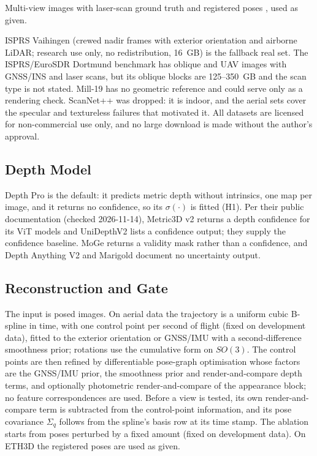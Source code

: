  Multi-view images with laser-scan ground truth and registered poses
\cite{data_eth3d}, used as given. 

 ISPRS Vaihingen (crewed nadir frames with exterior orientation and
airborne LiDAR; research use only, no redistribution, 16~GB) is the fallback real set. The ISPRS/EuroSDR
Dortmund benchmark has oblique and UAV images with GNSS/INS and laser scans, but its oblique blocks are
125--350~GB and the scan type is not stated. Mill-19 has no geometric reference and could serve only as a
rendering check. ScanNet++ was dropped: it is indoor, and the aerial sets cover the specular and
textureless failures that motivated it. All datasets are licensed for non-commercial use only, and no
large download is made without the author's approval.

\subsection{Depth Model}
Depth Pro \cite{est_depthpro} is the default: it predicts metric depth without intrinsics, one map per
image, and it returns no confidence, so its $\sigma(\cdot)$ is fitted (H1). Per their public
documentation (checked 2026-11-14), Metric3D v2 returns a depth confidence for its ViT models and
UniDepthV2 lists a confidence output; they supply the confidence baseline. MoGe returns a validity
mask rather than a confidence, and Depth Anything V2 and Marigold document no uncertainty output.

\subsection{Reconstruction and Gate}
 The input is posed images. On aerial data the trajectory is a uniform cubic B-spline in time,
with one control point per second of flight (fixed on development data), fitted to the exterior
orientation or GNSS/IMU with a second-difference smoothness prior; rotations use the cumulative form on
$SO(3)$. The control points are then refined by differentiable pose-graph optimisation whose factors are
the GNSS/IMU prior, the smoothness prior and render-and-compare depth terms, and optionally photometric
render-and-compare of the appearance block; no feature correspondences are used. Before a view is
tested, its own render-and-compare term is subtracted from the control-point information, and its pose
covariance $\Sigma_q$ follows from the spline's basis row at its time stamp. The ablation starts from poses
perturbed by a fixed amount (fixed on development data). On ETH3D the registered poses are used as given.

